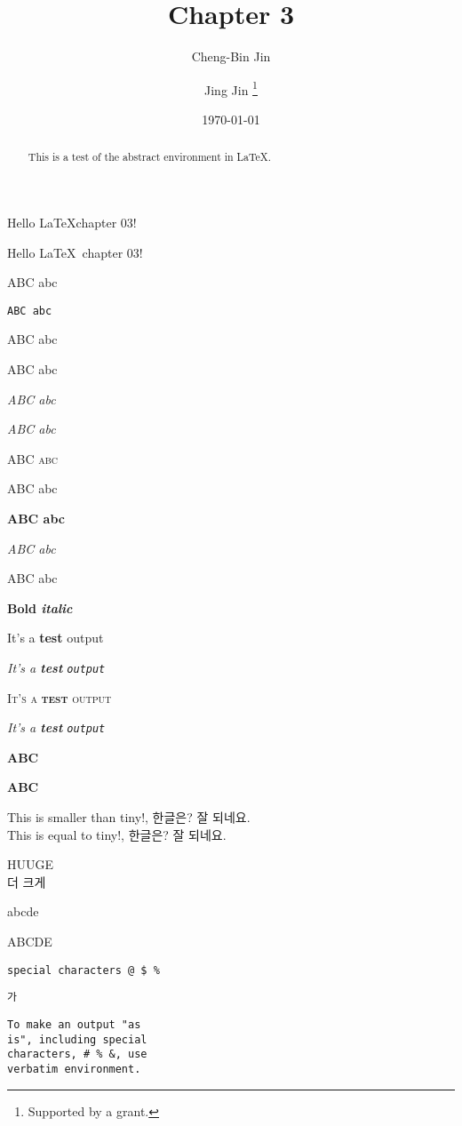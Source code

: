 \documentclass[11pt]{article}
\title{Chapter 3}
\author{Cheng-Bin Jin \and Jing Jin \thanks{Supported by a grant.}}
\date{\today}
\begin{document}
\maketitle

\begin{abstract}
This is a test of the abstract environment in \LaTeX.

\end{abstract}
\pagestyle{myheadings}

\thispagestyle{myheadings}

Hello \LaTeX chapter 03!

Hello \LaTeX \ chapter 03!

\textrm{ABC abc}

\texttt{ABC abc}

\textsf{ABC abc}

\textup{ABC abc}

\textit{ABC abc}

\textsl{ABC abc}

\textsc{ABC abc}

\textmd{ABC abc}

\textbf{ABC abc}

\emph{ABC abc}

\textnormal{ABC abc}

\textbf{Bold \textit{italic}}

\textup{It's a \textbf{test} \textrm{output}}

\textit{It's a \textbf{test} \texttt{output}}

\textsc{It's a \textbf{test} \textsf{output}}

\textsl{It's a \textbf{test} \texttt{output}}

{\Large \bf ABC}

{\bf \Large ABC}

{\fontsize{2.5pt}{5pt} \selectfont This is smaller than tiny!, 한글은? 잘 되네요.} \\
{\tiny This is equal to tiny!, 한글은? 잘 되네요.}

{\fontsize{3.3cm}{3.8cm} \selectfont HUUGE \\ 더 크게}

\lowercase{AbCdE}

\uppercase{AbCdE}

\verb|special characters @ $ %|

\verb|가|

\begin{verbatim}
To make an output "as
is", including special 
characters, # % &, use 
verbatim environment.
\end{verbatim}
\end{document}
